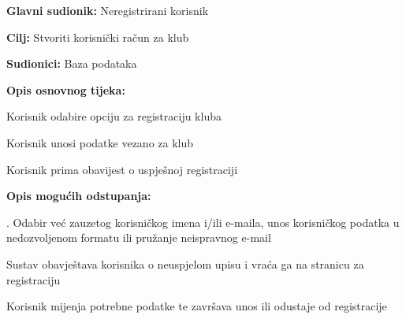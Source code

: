 					\noindent {}
					\begin{packed_item}
	
						\item \textbf{Glavni sudionik: }Neregistrirani korisnik
						\item  \textbf{Cilj:} Stvoriti korisnički račun za klub
						\item  \textbf{Sudionici:} Baza podataka
						\item  \textbf{Opis osnovnog tijeka:						
						}
						
						\item[] \begin{packed_enum}
	
							\item Korisnik odabire opciju za registraciju kluba
							\item Korisnik unosi podatke vezano za klub
							\item Korisnik prima obavijest o uspješnoj registraciji
							
						\end{packed_enum}
						
						\item  \textbf{Opis mogućih odstupanja:}
						
						\item[] \begin{packed_item}
	
							\item[4.a] . Odabir već zauzetog korisničkog imena i/ili e-maila, unos korisničkog podatka u nedozvoljenom formatu ili pružanje neispravnog e-mail

							\item[] \begin{packed_enum}
								
								\item Sustav obavještava korisnika o neuspjelom upisu i vraća ga na stranicu za registraciju
								\item Korisnik mijenja potrebne podatke te završava unos ili 
odustaje od registracije
																
							\end{packed_enum}
														
						\end{packed_item}
					\end{packed_item}
					
